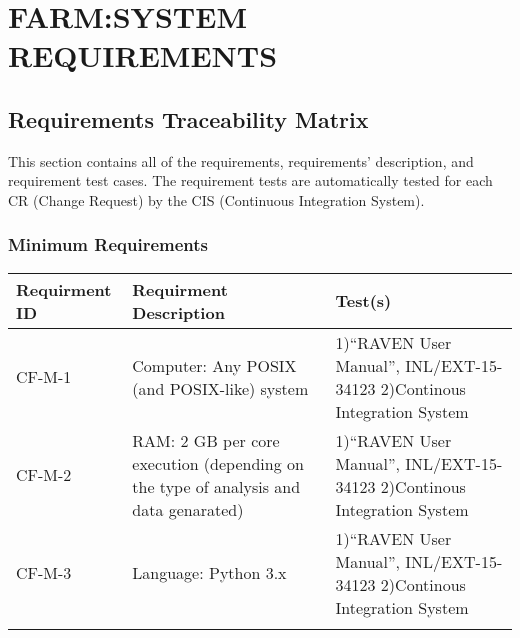  \section{FARM:SYSTEM REQUIREMENTS} 
 \subsection{Requirements Traceability Matrix} 
 This section contains all of the requirements, requirements' description, and 
 requirement test cases. The requirement tests are automatically tested for each 
 CR (Change Request) by the CIS (Continuous Integration System). 
 \newcolumntype{b}{X} 
 \subsubsection{Minimum Requirements} 
\begin{tabularx}{\textwidth}{|s|s|b|} 
\hline 
\textbf{Requirment ID} & \textbf{Requirment Description} & \textbf{Test(s)}  \\ \hline 
\hline 
 \hspace{0pt}CF-M-1 & \hspace{0pt}Computer: Any POSIX (and POSIX-like) system & \hspace{0pt}1)``RAVEN User Manual'', INL/EXT-15-34123 2)Continous Integration System \\ \hline 
\hline 
 \hspace{0pt}CF-M-2 & \hspace{0pt}RAM: 2 GB per core execution (depending on the type of analysis and data genarated) & \hspace{0pt}1)``RAVEN User Manual'', INL/EXT-15-34123 2)Continous Integration System \\ \hline 
\hline 
 \hspace{0pt}CF-M-3 & \hspace{0pt}Language: Python 3.x & \hspace{0pt}1)``RAVEN User Manual'', INL/EXT-15-34123 2)Continous Integration System \\ \hline 
\hline 
\caption*{Minimum Requirements}
\end{tabularx} 

